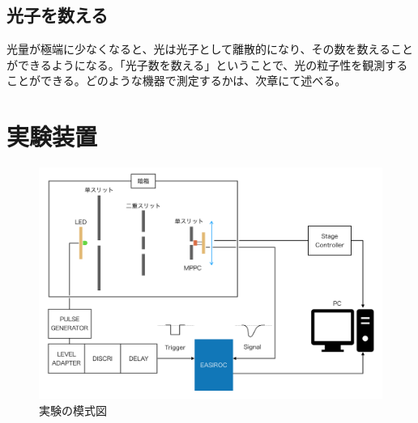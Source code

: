 \documentclass[uplatex,10pt,a4j]{jsarticle}
\begin{document}
\subsection{光子を数える}
光量が極端に少なくなると、光は光子として離散的になり、その数を数えることができるようになる。「光子数を数える」ということで、光の粒子性を観測することができる。どのような機器で測定するかは、次章にて述べる。


\section{実験装置}
\begin{figure}[h]
  \begin{center}
    \includegraphics[width=12cm]{setup2019.png}
  \end{center}
  \caption{実験の模式図}
\end{figure}
\end{document}
